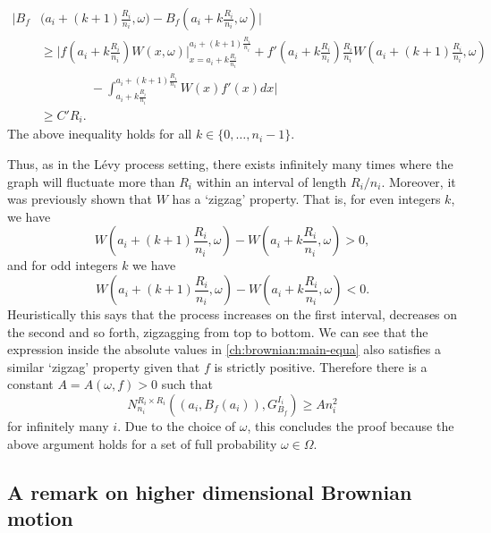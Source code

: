 	\begin{align}\label{ch:brownian:main-equa}
	    \bigg\vert B_f&\bigg(a_i+(k+1)\frac{R_i}{n_i},\omega\bigg)-B_f\left(a_i+k\frac{R_i}{n_i},\omega\right)\bigg\vert \\
	    &\ge \bigg\vert f\left(a_i + k \frac{R_i}{n_i}\right) W(x,\omega) \bigg\vert_{x=a_i+k\frac{R_i}{n_i}}^{a_i+(k+1)\frac{R_i}{n_i}} + f'\left(a_i + k\frac{R_i}{n_i}\right) \frac{R_i}{n_i} W\left(a_i +(k+1) \frac{R_i}{n_i},\omega\right) \nonumber\\ 
	    &\qquad \qquad- \int_{a_i+k \frac{R_i}{n_i}}^{a_i+(k+1)\frac{R_i}{n_1}}W(x)f'(x)dx \bigg\vert  \nonumber \\
	    & \ge C'R_i. \nonumber
	\end{align}
	The above inequality holds for all $k\in\{0,\dots,n_i-1\}$. 
	
	Thus, as in the L\'evy process setting, there exists infinitely many times where the graph will fluctuate more than $R_i$ within an interval of length $R_i/n_i$. Moreover, it was previously shown that $W$ has a `zigzag' property. That is, for even integers $k$, we have
	\[
	W\left(a_i+(k+1)\frac{R_i}{n_i},\omega\right)-W\left(a_i+k\frac{R_i}{n_i},\omega\right)>0,
	\] 
	and for odd integers $k$ we have
	\[
	W\left(a_i+(k+1)\frac{R_i}{n_i},\omega\right)-W\left(a_i+k\frac{R_i}{n_i},\omega\right)<0.
	\]  
	Heuristically this says that the process increases on the first interval, decreases on the second and so forth, zigzagging from top to bottom. We can see that the expression inside the absolute values in \eqref{ch:brownian:main-equa} also satisfies a similar `zigzag' property given that $f$ is strictly positive. Therefore there is a constant $A=A(\omega,f)>0$ such that
	\[
	N_{n_i}^{R_i\times R_i} \left( (a_i, B_f(a_i)), G_{B_f}^{I_i} \right) \ge  A n_i^2
	\] 
	for infinitely many $i$. Due to the choice of $\omega$, this concludes the proof because the above argument holds for a set of full probability $\omega\in\Omega$.





\subsection{A remark on higher dimensional Brownian motion}\label{ch-brownian:sec:higher-dim}

